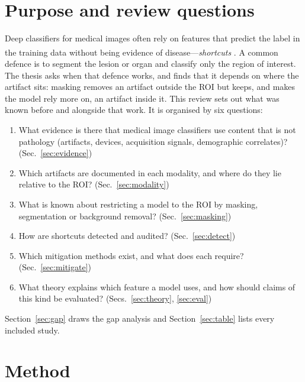\documentclass[11pt,a4paper]{article}
\newcommand{\bg}{\textsuperscript{\dag}}
\begin{document}
\section{Purpose and review questions}\label{sec:purpose}
Deep classifiers for medical images often rely on features that predict the label in the training data without being
evidence of disease---\emph{shortcuts} \citep{geirhos2020shortcut}\bg. A common defence is to segment the lesion or
organ and classify only the region of interest. The thesis asks when that defence works, and finds that it depends on
where the artifact sits: masking removes an artifact outside the ROI but keeps, and makes the model rely more on, an
artifact inside it. This review sets out what was known before and alongside that work. It is organised by six
questions:
\begin{enumerate}[label=\textbf{RQ\arabic*},leftmargin=3em,itemsep=1pt]
\item What evidence is there that medical image classifiers use content that is not pathology (artifacts, devices,
acquisition signals, demographic correlates)? (Sec.~\ref{sec:evidence})
\item Which artifacts are documented in each modality, and where do they lie relative to the ROI? (Sec.~\ref{sec:modality})
\item What is known about restricting a model to the ROI by masking, segmentation or background removal? (Sec.~\ref{sec:masking})
\item How are shortcuts detected and audited? (Sec.~\ref{sec:detect})
\item Which mitigation methods exist, and what does each require? (Sec.~\ref{sec:mitigate})
\item What theory explains which feature a model uses, and how should claims of this kind be evaluated? (Secs.~\ref{sec:theory}, \ref{sec:eval})
\end{enumerate}
Section~\ref{sec:gap} draws the gap analysis and Section~\ref{sec:table} lists every included study.

\section{Method}\label{sec:method}
\end{document}
